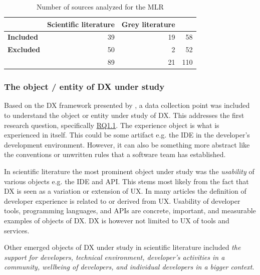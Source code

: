 \documentclass[english, 12pt, a4paper, sci, utf8, a-1b, online]{aaltothesis}
\newcounter{subsubsubsection}[subsubsection]
\begin{document}

\begin{table}[ht]
  \begin{center}
    \begin{tabular}{l | r r | r}
                        & \textbf{Scientific literature} & \textbf{Grey literature} &     \\
      \hline
      \textbf{Included} & 39                             & 19                       & 58  \\
      \textbf{Excluded} & 50                             & 2                        & 52  \\
      \hline
                        & 89                             & 21                       & 110
    \end{tabular}
    \captionsetup{width=0.6\textwidth}
    \caption{Number of sources analyzed for the MLR}
    \label{table:number-of-sources}
  \end{center}
\end{table}

\subsubsection{The object / entity of DX under study}

Based on the DX framework presented by \textcite{fagerholm-doctoral-thesis}, a data collection point was included to understand the object or entity under study of DX. This addresses the first research question, specifically \hyperref[RQ1.1]{RQ1.1}. The experience object is what is experienced in itself. This could be some artifact e.g. the IDE in the developer's development environment. However, it can also be something more abstract like the conventions or unwritten rules that a software team has established.


In scientific literature the most prominent object under study was the \textit{usability} of various objects e.g. the IDE and API. This stems most likely from the fact that DX is seen as a variation or extension of UX. In many articles the definition of developer experience is related to or derived from UX. Usability of developer tools, programming languages, and APIs are concrete, important, and measurable examples of objects of DX. DX is however not limited to UX of tools and services.

Other emerged objects of DX under study in scientific literature included \textit{the support for developers, technical environment, developer's activities in a community, wellbeing of developers, and individual developers in a bigger context}.
\end{document}
